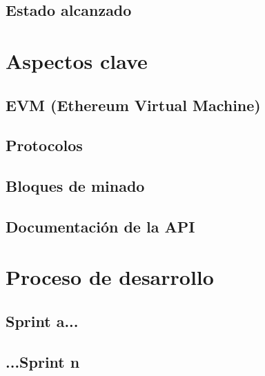 \subsection{Estado alcanzado}

\section{Aspectos clave}

\subsection{EVM (Ethereum Virtual Machine)}

\subsection{Protocolos} %

\subsection{Bloques de minado}

\subsection{Documentación de la API}

\section{Proceso de desarrollo}

\subsection{Sprint a...}

\subsection{...Sprint n}